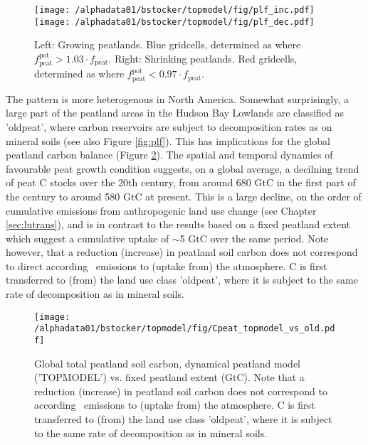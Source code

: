 \begin{figure}[ht!]
\begin{center}
  \texttt{[image: /alphadata01/bstocker/topmodel/fig/plf\_inc.pdf]}
  \texttt{[image: /alphadata01/bstocker/topmodel/fig/plf\_dec.pdf]}
\end{center}
\caption{Left: Growing peatlands. Blue gridcells, determined as where $f_{\text{peat}}^{\text{pot}} > 1.03 \cdot f_{\text{peat}}$. Right: Shrinking peatlands. Red gridcells, determined as where $f_{\text{peat}}^{\text{pot}} < 0.97 \cdot f_{\text{peat}}$. }
\label{fig:pt_active}
\end{figure}

The pattern is more heterogenous in North America. Somewhat surprisingly, a large part of the peatland areas in the Hudson Bay Lowlands are classified as 'oldpeat', where carbon reservoirs are subject to decomposition rates as on mineral soils (see also Figure \ref{fig:plf}). This has implications for the global peatland carbon balance (Figure \ref{fig:Cpeat}). The spatial and temporal dynamics of favourable peat growth condition suggests, on a global average, a decilning trend of peat C stocks over the 20th century, from around 680 GtC in the first part of the century to around 580 GtC at present. This is a large decline, on the order of cumulative emissions from anthropogenic land use change (see Chapter \ref{sec:lutrans}), and is in contrast to the results based on a fixed peatland extent which suggest a cumulative uptake of $\sim$5 GtC over the same period. Note however, that a reduction (increase) in peatland soil carbon does not correspond to direct according \coo\ emissions to (uptake from) the atmosphere. C is first transferred to (from) the land use class 'oldpeat', where it is subject to the same rate of decomposition as in mineral soils.
\begin{figure}
\begin{center}
  \texttt{[image: /alphadata01/bstocker/topmodel/fig/Cpeat\_topmodel\_vs\_old.pdf]}
\end{center}
\caption{
Global total peatland soil carbon, dynamical peatland model ('TOPMODEL') vs. fixed peatland extent \citep{tarnocai09gbc} (GtC). Note that a reduction (increase) in peatland soil carbon does not correspond to according \coo\ emissions to (uptake from) the atmosphere. C is first transferred to (from) the land use class 'oldpeat', where it is subject to the same rate of decomposition as in mineral soils.}
\label{fig:Cpeat}
\end{figure}

